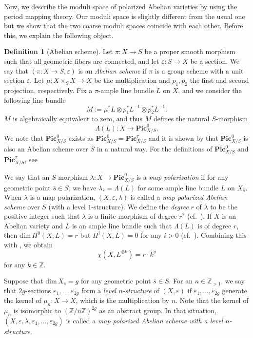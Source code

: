 \documentclass[12pt,twoside]{amsart}
\theoremstyle{definition}
\newtheorem{defn}[thm]{Definition}
\begin{document}
Now, we describe the moduli space of polarized Abelian varieties by using the period mapping theory.
Our moduli space is slightly different from the usual one but we show that the two coarse moduli spaces coincide with each other.
Before this, we explain the following object.
\begin{defn}[Abelian scheme]\label{defn--abelscheme}
    Let $\pi\colon X\to S$ be a proper smooth morphism such that all geometric fibers are connected, and let $\varepsilon \colon S\to X$ be a section.
   We say that $(\pi\colon X\to S,\varepsilon)$ is an {\em Abelian scheme} if $\pi$ is a group scheme with a unit section $\varepsilon$.
    Let $\mu\colon X\times_SX\to X$ be the multiplication and $p_1,p_2$ the first and second projection, respectively.
    Fix a $\pi$-ample line bundle $L$ on $X$, and we consider the following line bundle
    \[
    M:=\mu^*L\otimes p_1^*L^{-1}\otimes p_2^*L^{-1}.
    \]
    $M$ is algebraically equivalent to zero, and thus $M$ defines the natural $S$-morphism
    \[
    \Lambda(L)\colon X\to \mathbf{Pic}^0_{X/S}.
    \]
    We note that $\mathbf{Pic}^0_{X/S}$ exists as $\mathbf{Pic}^0_{X/S}=\mathbf{Pic}^\tau_{X/S}$ and it is shown by \cite[Corollary 6.8]{GIT} that $\mathbf{Pic}^0_{X/S}$ is also an Abelian scheme over $S$ in a natural way. For the definitions of $\mathbf{Pic}^0_{X/S}$ and $\mathbf{Pic}^\tau_{X/S}$, see \cite[Proposition 9.5.20 and Definition 9.6.8]{FGA}

    We say that an $S$-morphism $\lambda\colon X\to \mathbf{Pic}^0_{X/S}$ is a {\em map polarization} if for any geometric point $\bar{s}\in S$, we have $\lambda_{\bar{s}}=\Lambda(L)$ for some ample line bundle $L$ on $X_{\bar{s}}$. 
    When $\lambda$ is a map polarization, $(X,\varepsilon,\lambda)$ is called a {\em map polarized Abelian scheme} over $S$ (with a level $1$-structure).
     We define the {\em degree} $r$ of $\lambda$ to be the positive integer such that $\lambda$ is a finite morphism of degree $r^2$ (cf.~\cite[Lemma 6.12]{GIT}).
     If $X$ is an Abelian variety and $L$ is an ample line bundle such that $\Lambda(L)$ is of degree $r$, then $\mathrm{dim}\,H^0(X,L)=r$ but $H^i(X,L)=0$ for any $i>0$ (cf.~\cite[Proposition 6.13]{GIT}).
     Combining this with \cite[Proposition 6.10]{GIT}, we obtain
     \[
     \chi(X,L^{\otimes k})=r\cdot k^g
     \]
     for any $k\in\mathbb{Z}$.

Suppose that $\mathrm{dim}\,X_{\bar{s}}=g$ for any geometric point $\bar{s}\in S$.
For an $n\in\mathbb{Z}_{>1}$, we say that $2g$-sections $\varepsilon_1,\ldots,\varepsilon_{2g}$ form a {\em level $n$-structure} of $(X,\varepsilon)$ if $\varepsilon_1,\ldots,\varepsilon_{2g}$ generate the kernel of $\mu_n\colon X\to X$, which is the multiplication by $n$.
Note that the kernel of $\mu_n$ is isomorphic to $(\mathbb{Z}/n\mathbb{Z})^{2g}$ as an abstract group.
In that situation, $(X,\varepsilon,\lambda,\varepsilon_1,\ldots,\varepsilon_{2g})$ is called a {\em map polarized Abelian scheme with a level $n$-structure}.
\end{defn}
\end{document}
